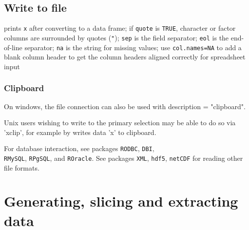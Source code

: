 
\subsection{Write to file}{}
{prints {\tt x} after converting to a data frame; if {\tt quote} is {\tt TRUE},
character or factor columns are surrounded by quotes ({\tt "}); {\tt sep} is
the field separator; {\tt eol} is the end-of-line separator; {\tt na} is the
string for missing values; use {\tt col.names=NA} to add a blank column header
to get the column headers aligned correctly for spreadsheet input}

\subsubsection{Clipboard}{On windows, the file connection can also be used with description = "clipboard".}


Unix users wishing to write to the primary selection may be able to do so via
'xclip', for example by
	{writes data 'x' to clipboard}.

For database interaction, see packages {\tt RODBC}, {\tt DBI},\\
{\tt RMySQL}, {\tt RPgSQL}, and {\tt ROracle}. See packages {\tt XML},
{\tt hdf5}, {\tt netCDF} for reading other file formats.

\section{Generating, slicing and extracting data}{}
